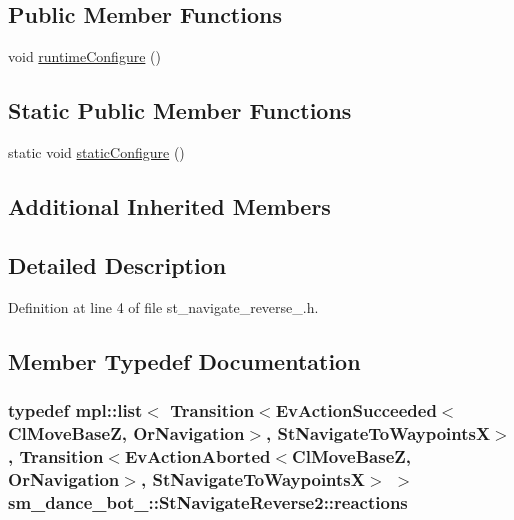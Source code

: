 \subsection*{Public Member Functions}
\begin{DoxyCompactItemize}
\item 
void \hyperlink{structsm__dance__bot__3_1_1StNavigateReverse2_afb6ae94b68b5560e7a48f24e8acc0d55}{runtime\+Configure} ()
\end{DoxyCompactItemize}
\subsection*{Static Public Member Functions}
\begin{DoxyCompactItemize}
\item 
static void \hyperlink{structsm__dance__bot__3_1_1StNavigateReverse2_aa40553f171a92c75e24be7668dfc16d6}{static\+Configure} ()
\end{DoxyCompactItemize}
\subsection*{Additional Inherited Members}


\subsection{Detailed Description}


Definition at line 4 of file st\+\_\+navigate\+\_\+reverse\+\_.\+h.



\subsection{Member Typedef Documentation}
\subsubsection[{\texorpdfstring{reactions}{reactions}}]{\setlength{\rightskip}{0pt plus 5cm}typedef mpl\+::list$<$ Transition$<$Ev\+Action\+Succeeded$<${\bf Cl\+Move\+BaseZ}, {\bf Or\+Navigation}$>$, {\bf St\+Navigate\+To\+WaypointsX}$>$, Transition$<$Ev\+Action\+Aborted$<${\bf Cl\+Move\+BaseZ}, {\bf Or\+Navigation}$>$, {\bf St\+Navigate\+To\+WaypointsX}$>$ $>$ {\bf sm\+\_\+dance\+\_\+bot\+\_\+::\+St\+Navigate\+Reverse2\+::reactions}}\hypertarget{structsm__dance__bot__3_1_1StNavigateReverse2_af67c193b37854515a77146f8ec58ed8c}{}\label{structsm__dance__bot__3_1_1StNavigateReverse2_af67c193b37854515a77146f8ec58ed8c}


